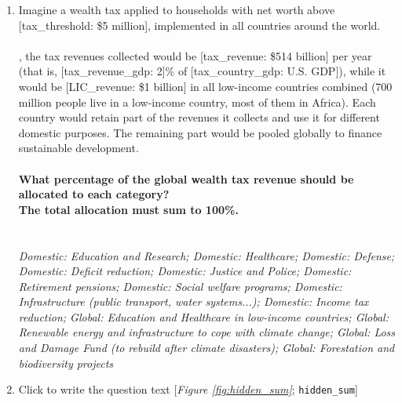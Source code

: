 \begin{enumerate}[resume]
\item  \label{q:revenue_split_many} Imagine a wealth tax applied to households with net worth above [tax\_threshold: \$5 million], implemented in all countries around the world.
\\\\[tax\_country\_name: In the U.S.], the tax revenues collected would be [tax\_revenue: \$514 billion] per year (that is, [tax\_revenue\_gdp: 2]\% of [tax\_country\_gdp: U.S. GDP]), while it would be [LIC\_revenue: \$1 billion] in all low-income countries combined (700 million people live in a low-income country, most of them in Africa).
Each country would retain part of the revenues it collects and use it for different domestic purposes. The remaining part would be pooled globally to finance sustainable development.
\\\\\textbf{What percentage of the global wealth tax revenue should be allocated to each category?}\~\\\textbf{The total allocation must sum to
100\%.}\\\\ [\textit{Figure \ref{fig:revenue_split_many}}; 
\verb|revenue_split_many|]
  \\ \textit{Domestic: Education and Research; Domestic: Healthcare; Domestic: Defense; Domestic: Deficit reduction; Domestic: Justice and Police; Domestic: Retirement pensions; Domestic: Social welfare programs; Domestic: Infrastructure (public transport, water systems...); Domestic: Income tax reduction; Global: Education and Healthcare in low-income countries; Global: Renewable energy and infrastructure to cope with climate change; Global: Loss and Damage Fund (to rebuild after climate disasters); Global: Forestation and biodiversity projects}

\item  \label{q:hidden_sum} Click to write the question text [\textit{Figure \ref{fig:hidden_sum}}; 
\verb|hidden_sum|]


\end{enumerate} 

